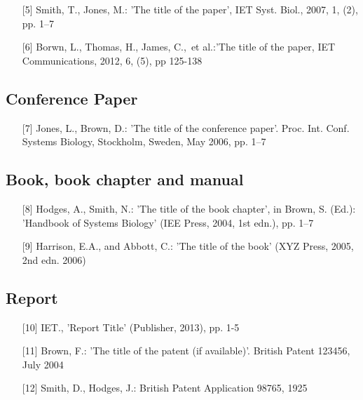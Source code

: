 \documentclass{cta-author}
\begin{document}
\begin{enumerate}
\item[{[5]}] Smith, T., Jones, M.: 'The title of the paper', IET Syst. Biol., 2007,
1, (2), pp. 1--7\vspace*{6pt}

\item[{[6]}] Borwn, L., Thomas, H., James, C.,~et al.:'The title of the paper, IET
Communications, 2012, 6, (5), pp 125-138
\end{enumerate}

\subsection{Conference Paper}\label{subsec13.4}

\begin{enumerate}
\item[{[7]}]
Jones, L., Brown, D.: 'The title of the conference paper'. Proc. Int.
Conf. Systems Biology, Stockholm, Sweden, May 2006, pp. 1--7
\end{enumerate}

\subsection{Book, book chapter and manual}\label{subsec13.5}

\begin{enumerate}
\item[{[8]}] Hodges, A., Smith, N.: 'The title of the book chapter', in Brown, S.
(Ed.): 'Handbook of Systems Biology' (IEE Press, 2004, 1st edn.), pp. 1--7\vspace*{6pt}

\item[{[9]}]
Harrison, E.A., and Abbott, C.: 'The title of the book' (XYZ Press,
2005, 2nd edn. 2006)
\end{enumerate}

\subsection{Report}\label{subsec13.6}

\begin{enumerate}
\item[{[10]}] IET., 'Report Title' (Publisher, 2013), pp. 1-5\vspace*{6pt}

\item[{[11]}] Brown, F.: 'The title of the patent (if available)'. British Patent
123456, July\vadjust{\pagebreak} 2004

\item[{[12]}] Smith, D., Hodges, J.: British Patent Application 98765, 1925
\end{enumerate}
\end{document}
